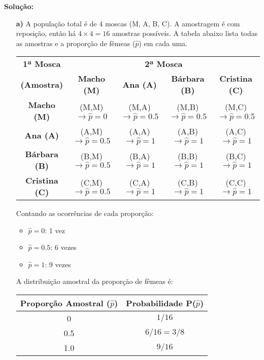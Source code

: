 \documentclass[12pt, a4paper]{article}
\begin{document}
\textbf{Solução:}
\begin{itemize}
    \item[\textbf{a)}] A população total é de 4 moscas (M, A, B, C). A amostragem é com reposição, então há $4 \times 4 = 16$ amostras possíveis. A tabela abaixo lista todas as amostras e a proporção de fêmeas ($\hat{p}$) em cada uma.

    \begin{center}
    \begin{tabular}{c|cccc}
        \toprule
        \textbf{1ª Mosca} & \multicolumn{4}{c}{\textbf{2ª Mosca}} \\
        \cmidrule{2-5}
        \textbf{(Amostra)} & \textbf{Macho (M)} & \textbf{Ana (A)} & \textbf{Bárbara (B)} & \textbf{Cristina (C)} \\
        \midrule
        \textbf{Macho (M)} & (M,M) $\to \hat{p}=0$ & (M,A) $\to \hat{p}=0.5$ & (M,B) $\to \hat{p}=0.5$ & (M,C) $\to \hat{p}=0.5$ \\
        \textbf{Ana (A)} & (A,M) $\to \hat{p}=0.5$ & (A,A) $\to \hat{p}=1$ & (A,B) $\to \hat{p}=1$ & (A,C) $\to \hat{p}=1$ \\
        \textbf{Bárbara (B)} & (B,M) $\to \hat{p}=0.5$ & (B,A) $\to \hat{p}=1$ & (B,B) $\to \hat{p}=1$ & (B,C) $\to \hat{p}=1$ \\
        \textbf{Cristina (C)} & (C,M) $\to \hat{p}=0.5$ & (C,A) $\to \hat{p}=1$ & (C,B) $\to \hat{p}=1$ & (C,C) $\to \hat{p}=1$ \\
        \bottomrule
    \end{tabular}
    \end{center}
    
    Contando as ocorrências de cada proporção:
    \begin{itemize}
        \item $\hat{p} = 0$: 1 vez
        \item $\hat{p} = 0.5$: 6 vezes
        \item $\hat{p} = 1$: 9 vezes
    \end{itemize}
    
    A distribuição amostral da proporção de fêmeas é:
    \begin{center}
    \begin{tabular}{cc}
        \toprule
        \textbf{Proporção Amostral ($\hat{p}$)} & \textbf{Probabilidade P($\hat{p}$)} \\
        \midrule
        0 & $1/16$ \\
        0.5 & $6/16 = 3/8$ \\
        1.0 & $9/16$ \\
        \bottomrule
    \end{tabular}
    \end{center}


\end{itemize}
\end{document}
